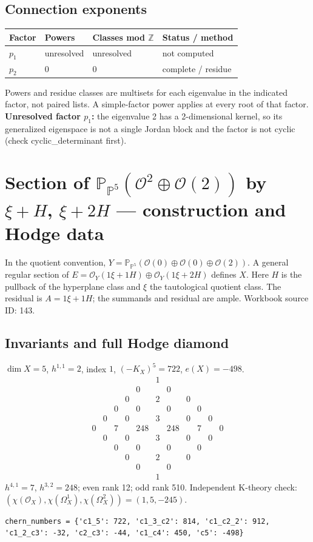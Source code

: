 \documentclass[10pt,a4paper]{article}
\begin{document}
\subsection*{Connection exponents}
\begin{center}\begin{tabular}{llll}\toprule Factor & Powers & Classes mod $\mathbb Z$ & Status / method\\\midrule
$p_{1}$ & unresolved & unresolved & not computed\\
$p_{2}$ & $0$ & $0$ & complete / residue\\
\bottomrule\end{tabular}\end{center}
Powers and residue classes are multisets for each eigenvalue in the indicated factor, not paired lists. A simple-factor power applies at every root of that factor.
\textbf{Unresolved factor $p_{1}$:} the eigenvalue 2 has a 2-dimensional kernel, so its generalized eigenspace is not a single Jordan block and the factor is not cyclic (check cyclic\_determinant first).
\clearpage\section*{Section of $\mathbb P_{\mathbb P^{5}}(\mathcal O^{2}\oplus \mathcal O(2))$ by $\xi +H$, $\xi +2H$ --- construction and Hodge data}\label{entry:PB5-143}
In the quotient convention, $Y=\mathbb P_{\mathbb P^{5}}(\mathcal O(0)\oplus\mathcal O(0)\oplus\mathcal O(2))$.
A general regular section of $E=\mathcal O_Y(1\xi+1H)\oplus\mathcal O_Y(1\xi+2H)$ defines $X$.
Here $H$ is the pullback of the hyperplane class and $\xi$ the tautological quotient class. The residual is $A=1\xi+1H$; the summands and residual are ample.
Workbook source ID: 143.
\subsection*{Invariants and full Hodge diamond}
$\dim X=5$, $h^{1,1}=2$, index $1$, $(-K_X)^5=722$, $e(X)=-498$.
\[\begin{array}{ccccccccccc}&&&&&1&&&&&\\&&&&0&&0&&&&\\&&&0&&2&&0&&&\\&&0&&0&&0&&0&&\\&0&&0&&3&&0&&0&\\0&&7&&248&&248&&7&&0\\&0&&0&&3&&0&&0&\\&&0&&0&&0&&0&&\\&&&0&&2&&0&&&\\&&&&0&&0&&&&\\&&&&&1&&&&&\end{array}\]
$h^{4,1}=7$, $h^{3,2}=248$; even rank 12; odd rank 510.
Independent K-theory check: $(\chi(\mathcal O_X),\chi(\Omega_X^1),\chi(\Omega_X^2))=(1, 5, -245)$.
\begin{lstlisting}
chern_numbers = {'c1_5': 722, 'c1_3_c2': 814, 'c1_c2_2': 912, 'c1_2_c3': -32, 'c2_c3': -44, 'c1_c4': 450, 'c5': -498}
\end{lstlisting}
\end{document}

